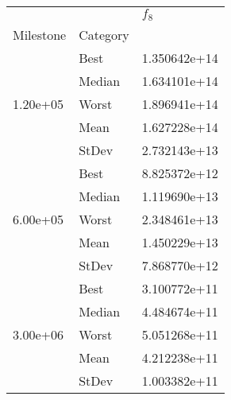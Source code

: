 \begin{tabular}{lll}
\toprule
         &      &      $f_{8}$ \\
Milestone & Category &              \\
\midrule
\multirow{5}{*}{1.20e+05} & Best & 1.350642e+14 \\
         & Median & 1.634101e+14 \\
         & Worst & 1.896941e+14 \\
         & Mean & 1.627228e+14 \\
         & StDev & 2.732143e+13 \\
\cline{1-3}
\multirow{5}{*}{6.00e+05} & Best & 8.825372e+12 \\
         & Median & 1.119690e+13 \\
         & Worst & 2.348461e+13 \\
         & Mean & 1.450229e+13 \\
         & StDev & 7.868770e+12 \\
\cline{1-3}
\multirow{5}{*}{3.00e+06} & Best & 3.100772e+11 \\
         & Median & 4.484674e+11 \\
         & Worst & 5.051268e+11 \\
         & Mean & 4.212238e+11 \\
         & StDev & 1.003382e+11 \\
\bottomrule
\end{tabular}
